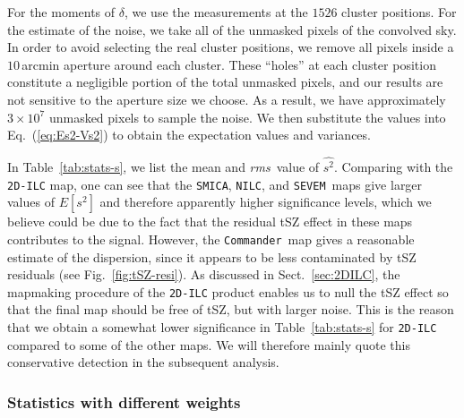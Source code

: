 \documentclass[traditabstract, longauth]{aa}
\newcommand{\nilc}{{\tt NILC}}
\newcommand{\sevem}{{\tt SEVEM}}
\newcommand{\smica}{{\tt SMICA}}
\newcommand{\commander}{{\tt Commander}}
\newcommand{\1}{\'\i }
\def \rms{{\it rms}}
\begin{document}
For the moments of $\delta$, we use the measurements at the $1526$ cluster positions.
For the estimate of the noise, we take all of the unmasked pixels of the
convolved sky. In order to avoid selecting the real cluster positions,
we remove all pixels inside a $10\,$arcmin aperture around each cluster. These
``holes'' at each cluster position constitute a negligible portion of the total
unmasked pixels, and our results are not sensitive to the aperture size we
choose. As a result, we have approximately $3\times 10^{7}$ unmasked pixels
to sample the noise. We then substitute the values into
Eq.~(\ref{eq:Es2-Vs2}) to obtain the expectation values
and variances.

In Table~\ref{tab:stats-s}, we list the mean and \rms\ value of
$\widehat{s^{2}}$. Comparing with the {\tt 2D-ILC} map, one can see that
the \smica, \nilc, and \sevem\ maps give larger values of $E[s^{2}]$ and
therefore apparently higher significance levels,
which we believe could be due to the fact that the residual tSZ effect in
these maps contributes to the signal. However, the \commander\
map gives a reasonable estimate of the dispersion, since it appears to be less
contaminated by tSZ residuals (see Fig.~\ref{fig:tSZ-resi}).  As discussed
in Sect.~\ref{sec:2DILC}, the mapmaking procedure of the {\tt 2D-ILC} product
enables us to null the tSZ effect so that the final map should be free of tSZ,
but with larger noise. This is the reason that we obtain a somewhat lower
significance in Table~\ref{tab:stats-s} for {\tt 2D-ILC} compared to some
of the other maps.  We will therefore mainly quote this
conservative detection in the subsequent analysis.

\subsubsection{Statistics with different weights}
\label{sec:diff-weight}
\end{document}
